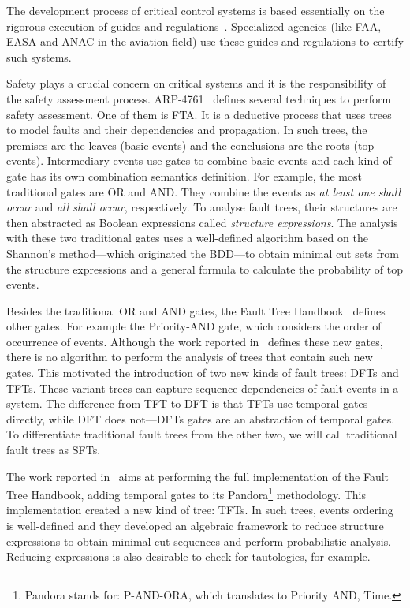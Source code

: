 \documentclass[en,twoside,onehalfspacing,phd]{risethesis}
\def\FThandbook{Fault Tree Handbook~\cite{VGR+1981}\index{Fault Tree!Handbook}%
  \gdef\FThandbook{Fault Tree Handbook\index{Fault Tree!Handbook}\xspace}%
  \xspace}
\def\pandora{Pandora\footnote{Pandora stands for: P-AND-ORA, which translates to Priority AND, Time.}%
  \gdef\pandora{Pandora\xspace}%
  \xspace}
\begin{document}
The development process of critical control systems is based essentially on the rigorous execution of guides and regulations~\cite{ANAC2011,FAA1993,FAA2007,SAE1996b}.
Specialized agencies (like FAA, EASA and ANAC in the aviation field) use these guides and regulations to certify such systems.

Safety plays a crucial concern on critical systems and it is the responsibility of the safety assessment process.
ARP-4761~\cite{SAE1996b} defines several techniques to perform safety assessment.
One of them is \ac{FTA}.
It is a deductive process that uses trees to model faults and their dependencies and propagation.
In such trees, the premises are the leaves (basic events) and the conclusions are the roots (top events).
Intermediary events use gates to combine basic events and each kind of gate has its own combination semantics definition.
For example, the most traditional gates are OR and AND.
They combine the events as \emph{at least one shall occur} and \emph{all shall occur}, respectively.
To analyse fault trees, their structures are then abstracted as Boolean expressions called \emph{structure expressions}.
The analysis with these two traditional gates uses a well-defined algorithm based on the Shannon's method---which originated the \ac{BDD}---to obtain minimal cut sets from the structure expressions and a general formula to calculate the probability of top events.

Besides the traditional OR and AND gates, the \FThandbook defines other gates.
For example the Priority-AND gate, which considers the order of occurrence of events.
Although the work reported in~\cite{VGR+1981} defines these new gates, there is no algorithm to perform the analysis of trees that contain such new gates.
This motivated the introduction of two new kinds of fault trees: \acp{DFT} and \acp{TFT}.
These variant trees can capture sequence dependencies of fault events in a system.
The difference from \ac{TFT} to \ac{DFT} is that \acp{TFT} use temporal gates directly, while \ac{DFT} does not---\acp{DFT} gates are an abstraction of temporal gates.
To differentiate traditional fault trees from the other two, we will call traditional fault trees as \acp{SFT}.

The work reported in~\cite{WP2009} aims at performing the full implementation of the \FThandbook, adding temporal gates to its \pandora methodology.
This implementation created a new kind of tree: \acp{TFT}.
In such trees, events ordering is well-defined and they developed an algebraic framework to reduce structure expressions to obtain minimal cut sequences and perform probabilistic analysis.
Reducing expressions is also desirable to check for tautologies, for example.
\end{document}
